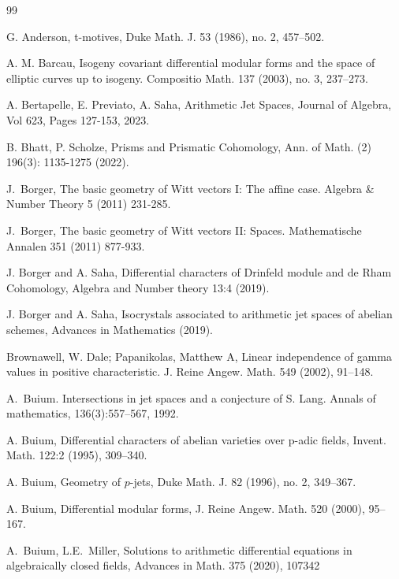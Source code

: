 \documentclass{amsart}
\numberwithin {equation}{section}
\begin{document}

\begin{thebibliography}{99}

 
G. Anderson, t-motives, Duke Math. J. 53 (1986), no. 2, 457–502.

A. M. Barcau, Isogeny covariant differential modular forms and the space of elliptic curves up to isogeny. Compositio Math. 137 (2003), no. 3, 237–273. 

 A. Bertapelle, E. Previato, A. Saha, 
Arithmetic Jet Spaces, Journal of Algebra, Vol 623, Pages 127-153, 2023. 

 B. Bhatt, P. Scholze, Prisms and Prismatic
 Cohomology, Ann. of Math. (2) 196(3): 1135-1275 (2022).


        J.~Borger,  The basic geometry of {W}itt vectors {I}: The affine case. Algebra \& Number Theory   5 (2011) 231-285.


        J.~Borger, The basic geometry of {W}itt vectors {II}: Spaces.
        Mathematische Annalen  351 (2011) 877-933.

 J. Borger and A. Saha, Differential characters of Drinfeld module and
de Rham Cohomology, Algebra and Number theory 13:4 (2019).

 J. Borger and A. Saha, Isocrystals associated to arithmetic jet spaces of abelian schemes, Advances in Mathematics (2019).

Brownawell, W. Dale; Papanikolas, Matthew A,  Linear independence of gamma values in positive characteristic. J. Reine Angew. Math. 549 (2002), 91–148.

 A.~Buium.
\newblock Intersections in jet spaces and a conjecture of S. Lang.
\newblock Annals of mathematics, 136(3):557--567, 1992.

 A. Buium, Differential characters of abelian varieties over p-adic fields, Invent. Math. 122:2 (1995), 309–340.

A. Buium, Geometry of $p$-jets, Duke Math. J. 82 (1996), no. 2, 349–367. 

 A. Buium, Differential modular forms, J. Reine Angew. Math. 520 (2000), 95–167.

A.~Buium, L.E.~Miller,
Solutions to arithmetic differential equations in algebraically
closed fields, Advances in Math. 375 (2020), 107342


\end{thebibliography}
\end{document}
